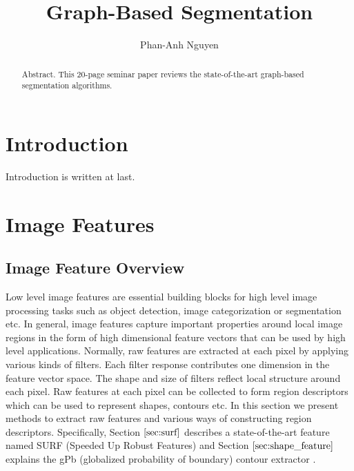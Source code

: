 \documentclass{SMBV12}
\begin{document}
\title{Graph-Based Segmentation}

\author{Phan-Anh Nguyen}

\maketitle


\begin{abstract}%
Abstract. This 20-page seminar paper reviews the state-of-the-art graph-based segmentation algorithms.
\end{abstract}



%
\section{Introduction}

Introduction is written at last.

%
\section{Image Features}

\subsection{Image Feature Overview}
Low level image features are essential building blocks for high level image processing tasks such as object detection, image categorization or segmentation etc. In general, image features capture important properties around local image regions in the form of high dimensional feature vectors that can be used by high level applications. Normally, raw features are extracted at each pixel by applying various kinds of filters. Each filter response contributes one dimension in the feature vector space. The shape and size of filters reflect local structure around each pixel. Raw features at each pixel can be collected to form region descriptors which can be used to represent shapes, contours etc. In this section we present methods to extract raw features and various ways of constructing region descriptors. Specifically, Section $\ref{sec:surf}$ describes a state-of-the-art feature named SURF (Speeded Up Robust Features) \cite{bay2006surf} and Section $\ref{sec:shape_feature}$ explains the gPb (globalized probability of boundary) contour extractor \cite{maire2008using}.
\end{document}
